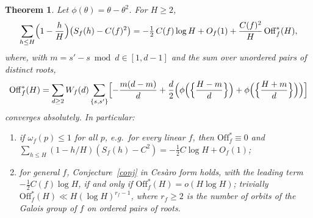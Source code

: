 \documentclass[11pt,a4paper]{article}
\newtheorem{theorem}{Theorem}
\theoremstyle{remark}\newtheorem{remark}[theorem]{Remark}
\begin{document}
\begin{theorem}\label{thm:smoothed}
Let $\phi(\theta)=\theta-\theta^2$. For $H\ge2$,
\begin{equation}\label{eq:smoothed}
\sum_{h\le H}\Bigl(1-\frac hH\Bigr)\bigl(S_f(h)-C(f)^2\bigr)=-\tfrac12\,C(f)\log H+O_f(1)+\frac{C(f)^2}{H}\,\mathrm{Off}^{\ast}_f(H),
\end{equation}
where, with $m=s'-s\bmod d\in[1,d-1]$ and the sum over unordered pairs of distinct roots,
\[
\mathrm{Off}^{\ast}_f(H)=\sum_{d\ge2}W_f(d)\sum_{\{s,s'\}}\Bigl[-\frac{m(d-m)}d+\frac d2\Bigl(\phi\Bigl(\Bigl\{\frac{H-m}d\Bigr\}\Bigr)+\phi\Bigl(\Bigl\{\frac{H+m}d\Bigr\}\Bigr)\Bigr)\Bigr]
\]
converges absolutely. In particular:
\begin{enumerate}
\item[(i)] if $\omega_f(p)\le1$ for all $p$, e.g.\ for every linear $f$, then $\mathrm{Off}^\ast_f\equiv0$ and
$\sum_{h\le H}(1-h/H)(S_f(h)-C^2)=-\tfrac12C\log H+O_f(1)$;
\item[(ii)] for general $f$, Conjecture~\ref{conj} in Ces\`aro form holds, with the leading term
$-\tfrac12C(f)\log H$, if and only if $\mathrm{Off}^\ast_f(H)=o(H\log H)$; trivially
$\mathrm{Off}^\ast_f(H)\ll H(\log H)^{r_f-1}$, where $r_f\ge2$ is the number of orbits of the Galois
group of $f$ on ordered pairs of roots.
\end{enumerate}
\end{theorem}
\end{document}

